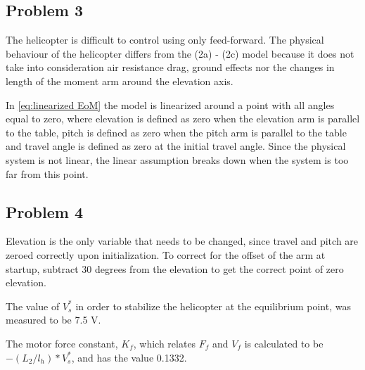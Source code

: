 \subsection{Problem 3}
The helicopter is difficult to control using only feed-forward. The
physical behaviour of the helicopter differs from the (2a) - (2c)
\cite[p.13]{assignment} model because it does not take into
consideration air resistance drag, ground effects nor the changes in
length of the moment arm around the elevation axis.

In \cref{eq:linearized EoM} the model is linearized around a point with
all angles equal to zero, where elevation is defined as zero when the
elevation arm is parallel to the table, pitch is defined as zero when
the pitch arm is parallel to the table and travel angle is defined as
zero at the initial travel angle. Since the physical system is not
linear, the linear assumption breaks down when the system is too far
from this point.

\subsection{Problem 4}
Elevation is the only variable that needs to be changed, since travel
and pitch are zeroed correctly upon initialization. To correct for the
offset of the arm at startup, subtract 30 degrees from the elevation
to get the correct point of zero elevation.

The value of $V^*_s$ in order to stabilize the helicopter at the
equilibrium point, was measured to be 7.5 V.

The motor force constant, $K_f$, which relates $F_f$ and $V_f$ is
calculated to be $-(L_2/l_h)*V^*_s$, and has the value 0.1332.


